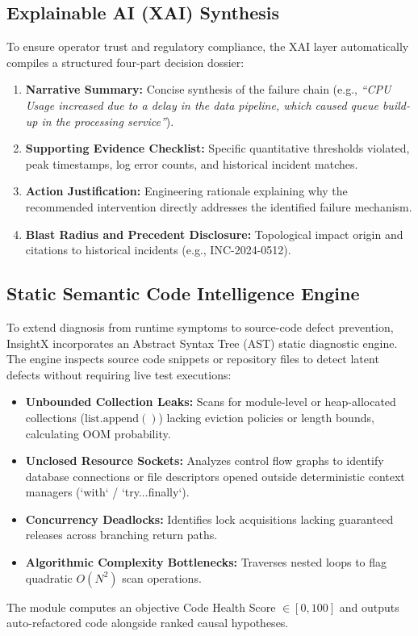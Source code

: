 \documentclass[conference]{IEEEtran}
\begin{document}
\subsection{Explainable AI (XAI) Synthesis}
To ensure operator trust and regulatory compliance, the XAI layer automatically compiles a structured four-part decision dossier:
\begin{enumerate}
    \item \textbf{Narrative Summary:} Concise synthesis of the failure chain (e.g., \textit{``CPU Usage increased due to a delay in the data pipeline, which caused queue build-up in the processing service''}).
    \item \textbf{Supporting Evidence Checklist:} Specific quantitative thresholds violated, peak timestamps, log error counts, and historical incident matches.
    \item \textbf{Action Justification:} Engineering rationale explaining why the recommended intervention directly addresses the identified failure mechanism.
    \item \textbf{Blast Radius and Precedent Disclosure:} Topological impact origin and citations to historical incidents (e.g., INC-2024-0512).
\end{enumerate}

\subsection{Static Semantic Code Intelligence Engine}
To extend diagnosis from runtime symptoms to source-code defect prevention, InsightX incorporates an Abstract Syntax Tree (AST) static diagnostic engine. The engine inspects source code snippets or repository files to detect latent defects without requiring live test executions:
\begin{itemize}
    \item \textbf{Unbounded Collection Leaks:} Scans for module-level or heap-allocated collections ($\text{list}.\text{append}()$) lacking eviction policies or length bounds, calculating OOM probability.
    \item \textbf{Unclosed Resource Sockets:} Analyzes control flow graphs to identify database connections or file descriptors opened outside deterministic context managers (`with` / `try...finally`).
    \item \textbf{Concurrency Deadlocks:} Identifies lock acquisitions lacking guaranteed releases across branching return paths.
    \item \textbf{Algorithmic Complexity Bottlenecks:} Traverses nested loops to flag quadratic $O(N^2)$ scan operations.
\end{itemize}
The module computes an objective Code Health Score $\in [0, 100]$ and outputs auto-refactored code alongside ranked causal hypotheses.
\end{document}
